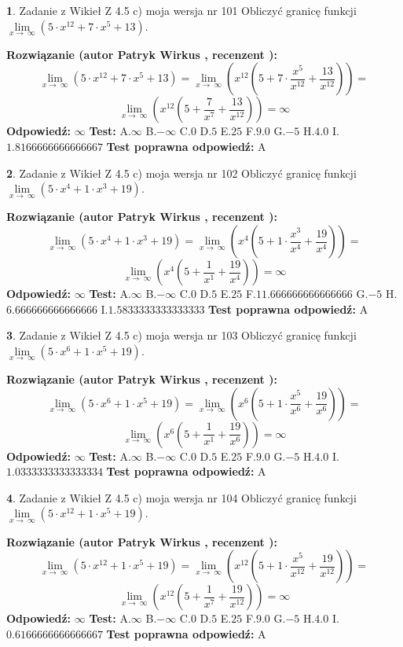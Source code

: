 \documentclass[12pt, a4paper]{article}
\theoremstyle{definition} %
\newtheorem{zad}{}
\newcommand{\zadStart}[1]{\begin{zad}#1\newline}
\newcommand{\zadStop}{\end{zad}}
\newcommand{\rozwStart}[2]{\noindent \textbf{Rozwiązanie (autor #1 , recenzent #2): }\newline}
\newcommand{\rozwStop}{\newline}
\newcommand{\odpStart}{\noindent \textbf{Odpowiedź:}\newline}
\newcommand{\odpStop}{\newline}
\newcommand{\testStart}{\noindent \textbf{Test:}\newline}
\newcommand{\testStop}{\newline}
\newcommand{\kluczStart}{\noindent \textbf{Test poprawna odpowiedź:}\newline}
\newcommand{\kluczStop}{\newline}
\begin{document}
\zadStart{Zadanie z Wikieł Z 4.5 c) moja wersja nr 101}
Obliczyć granicę funkcji  $\lim\limits_{x\to\ \infty}(5 \cdot x^{12}+7 \cdot x^{5}+13)$.
\zadStop
\rozwStart{Patryk Wirkus}{}
$$\lim\limits_{x\to\ \infty}(5 \cdot x^{12}+7 \cdot x^{5}+13) = \lim\limits_{x\to\ \infty}(x^{12}(5 +7 \cdot \frac{x^{5}}{x^{12}}+\frac{13}{x^{12}})) =$$ $$\lim\limits_{x\to\ \infty}(x^{12}(5 +\frac{7}{x^{7}}+\frac{13}{x^{12}})) =\infty$$
\rozwStop
\odpStart
$\infty$
\odpStop
\testStart
A.$\infty$ B.$-\infty$ C.$0$ D.$5$ E.$25$
F.$9.0$ G.$-5$
H.$4.0$
I.$1.8166666666666667$
\testStop
\kluczStart
A
\kluczStop



\zadStart{Zadanie z Wikieł Z 4.5 c) moja wersja nr 102}
Obliczyć granicę funkcji  $\lim\limits_{x\to\ \infty}(5 \cdot x^{4}+1 \cdot x^{3}+19)$.
\zadStop
\rozwStart{Patryk Wirkus}{}
$$\lim\limits_{x\to\ \infty}(5 \cdot x^{4}+1 \cdot x^{3}+19) = \lim\limits_{x\to\ \infty}(x^{4}(5 +1 \cdot \frac{x^{3}}{x^{4}}+\frac{19}{x^{4}})) =$$ $$\lim\limits_{x\to\ \infty}(x^{4}(5 +\frac{1}{x^{1}}+\frac{19}{x^{4}})) =\infty$$
\rozwStop
\odpStart
$\infty$
\odpStop
\testStart
A.$\infty$ B.$-\infty$ C.$0$ D.$5$ E.$25$
F.$11.666666666666666$ G.$-5$
H.$6.666666666666666$
I.$1.5833333333333333$
\testStop
\kluczStart
A
\kluczStop



\zadStart{Zadanie z Wikieł Z 4.5 c) moja wersja nr 103}
Obliczyć granicę funkcji  $\lim\limits_{x\to\ \infty}(5 \cdot x^{6}+1 \cdot x^{5}+19)$.
\zadStop
\rozwStart{Patryk Wirkus}{}
$$\lim\limits_{x\to\ \infty}(5 \cdot x^{6}+1 \cdot x^{5}+19) = \lim\limits_{x\to\ \infty}(x^{6}(5 +1 \cdot \frac{x^{5}}{x^{6}}+\frac{19}{x^{6}})) =$$ $$\lim\limits_{x\to\ \infty}(x^{6}(5 +\frac{1}{x^{1}}+\frac{19}{x^{6}})) =\infty$$
\rozwStop
\odpStart
$\infty$
\odpStop
\testStart
A.$\infty$ B.$-\infty$ C.$0$ D.$5$ E.$25$
F.$9.0$ G.$-5$
H.$4.0$
I.$1.0333333333333334$
\testStop
\kluczStart
A
\kluczStop



\zadStart{Zadanie z Wikieł Z 4.5 c) moja wersja nr 104}
Obliczyć granicę funkcji  $\lim\limits_{x\to\ \infty}(5 \cdot x^{12}+1 \cdot x^{5}+19)$.
\zadStop
\rozwStart{Patryk Wirkus}{}
$$\lim\limits_{x\to\ \infty}(5 \cdot x^{12}+1 \cdot x^{5}+19) = \lim\limits_{x\to\ \infty}(x^{12}(5 +1 \cdot \frac{x^{5}}{x^{12}}+\frac{19}{x^{12}})) =$$ $$\lim\limits_{x\to\ \infty}(x^{12}(5 +\frac{1}{x^{7}}+\frac{19}{x^{12}})) =\infty$$
\rozwStop
\odpStart
$\infty$
\odpStop
\testStart
A.$\infty$ B.$-\infty$ C.$0$ D.$5$ E.$25$
F.$9.0$ G.$-5$
H.$4.0$
I.$0.6166666666666667$
\testStop
\kluczStart
A
\kluczStop
\end{document}
